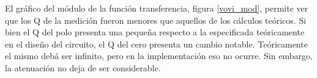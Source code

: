 El gr\'afico del m\'odulo de la funci\'on transferencia, figura \ref{vovi_mod}, permite ver que los Q de la medici\'on fueron menores que aquellos de los c\'alculos te\'oricos. Si bien el Q del polo presenta una peque\~na respecto a la especificada te\'oricamente en el dise\~no del circuito, el Q del cero presenta un cambio notable. Te\'oricamente el mismo deb\'a ser infinito, pero en la implementaci\'on eso no ocurre. Sin embargo, la atenuaci\'on no deja de ser considerable.

